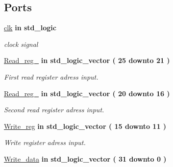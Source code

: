 \subsection*{\-Ports}
 \begin{DoxyCompactItemize}
\item 
\hypertarget{classregister__file_ae5e9fe74cd98136dd9bfe9fe944036a6}{\hyperlink{classregister__file_ae5e9fe74cd98136dd9bfe9fe944036a6}{clk}  {\bfseries {\bfseries in }} {\bfseries std\-\_\-logic } }\label{classregister__file_ae5e9fe74cd98136dd9bfe9fe944036a6}

\begin{DoxyCompactList}\small\item\em clock signal \end{DoxyCompactList}\item 
\hypertarget{classregister__file_a5ed2152c539c2ceb0607980c27b3b855}{\hyperlink{classregister__file_a5ed2152c539c2ceb0607980c27b3b855}{\-Read\-\_\-reg\-\_}  {\bfseries {\bfseries in }} {\bfseries std\-\_\-logic\-\_\-vector (   25    downto    21  ) } }\label{classregister__file_a5ed2152c539c2ceb0607980c27b3b855}

\begin{DoxyCompactList}\small\item\em \-First read register adress input. \end{DoxyCompactList}\item 
\hypertarget{classregister__file_a5f618c16ce27d5d1fbb470a067cd0ddf}{\hyperlink{classregister__file_a5f618c16ce27d5d1fbb470a067cd0ddf}{\-Read\-\_\-reg\-\_}  {\bfseries {\bfseries in }} {\bfseries std\-\_\-logic\-\_\-vector (   20    downto    16  ) } }\label{classregister__file_a5f618c16ce27d5d1fbb470a067cd0ddf}

\begin{DoxyCompactList}\small\item\em \-Second read register adress input. \end{DoxyCompactList}\item 
\hypertarget{classregister__file_a2fed508e2f436c760a1584fb86fc8196}{\hyperlink{classregister__file_a2fed508e2f436c760a1584fb86fc8196}{\-Write\-\_\-reg}  {\bfseries {\bfseries in }} {\bfseries std\-\_\-logic\-\_\-vector (   15    downto    11  ) } }\label{classregister__file_a2fed508e2f436c760a1584fb86fc8196}

\begin{DoxyCompactList}\small\item\em \-Write register adress input. \end{DoxyCompactList}\item 
\hypertarget{classregister__file_aa5f5791f55f67b340ebfeed6091de3ef}{\hyperlink{classregister__file_aa5f5791f55f67b340ebfeed6091de3ef}{\-Write\-\_\-data}  {\bfseries {\bfseries in }} {\bfseries std\-\_\-logic\-\_\-vector (   31    downto    0  ) } }\label{classregister__file_aa5f5791f55f67b340ebfeed6091de3ef}


\end{DoxyCompactItemize}
